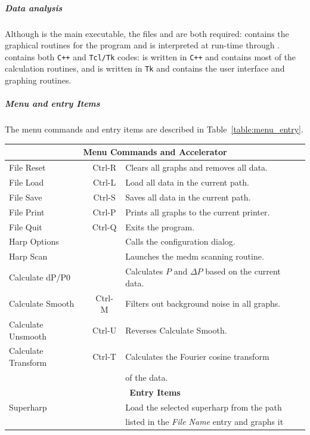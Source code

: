 	\subparagraph{Data analysis}\label{analysis}

Although  is the main executable, the files 
and  are both required:  contains the graphical routines
for the program and is interpreted at run-time through .  contains
both {\tt C++} and {\tt Tcl/Tk} codes:  is written in {\tt C++} and contains most
of the calculation routines, and  is written in {\tt Tk} and contains the user
interface and graphing routines.

	\subparagraph{Menu and entry Items}

The menu commands and entry items are described in Table~\ref{table:menu_entry}.
\begin{table}
\begin{center}
\begin{tabular}{||l|c|l||}
\hline
\hline
\multicolumn{3}{|c|}{\bf Menu Commands and Accelerator}	\\
\hline
File Reset & Ctrl-R & Clears all graphs and removes all data. \\
File Load  & Ctrl-L & Load all data in the current path. \\
File Save  & Ctrl-S & Saves all data in the current path. \\
File Print & Ctrl-P & Prints all graphs to the current printer.\\
File Quit & Ctrl-Q & Exits the program. \\
\hline
Harp Options & & Calls the configuration dialog. \\
Harp Scan & & Launches the medm scanning routine. \\
\hline
Calculate dP/P0 & & Calculates $P$ and $\Delta P$ based on the current data. \\
Calculate Smooth & Ctrl-M & Filters out background noise in all graphs. \\
Calculate Unsmooth & Ctrl-U & Reverses Calculate Smooth. \\
Calculate Transform & Ctrl-T & Calculates the Fourier cosine transform \\
		& & of the data. \\
\hline
\hline
\multicolumn{3}{|c|}{\bf Entry Items}	\\
\hline
Superharp	& & Load the selected superharp from the path	\\
		& & listed in the {\it File Name} entry and graphs it		\\

\end{tabular}
\end{center}
\end{table}
